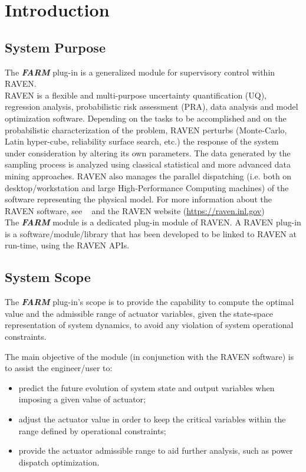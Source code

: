 \section{Introduction}
\subsection{System Purpose}

The \textbf{\textit{FARM}} plug-in is a generalized module for supervisory control within RAVEN.
\\RAVEN is a flexible and multi-purpose uncertainty quantification (UQ), regression analysis, probabilistic risk assessment 
(PRA), data analysis and model optimization software.  Depending on the tasks to be accomplished and on the 
probabilistic
 characterization of the problem, RAVEN perturbs (Monte-Carlo, Latin hyper-cube, reliability surface search, etc.) the
 response of the system under consideration by altering its own parameters. 
 The data generated by the sampling process is analyzed using classical statistical
 and more advanced data mining approaches. RAVEN also manages the parallel dispatching (i.e. both on
 desktop/workstation and large High-Performance Computing machines) of the software representing the physical 
 model.
 For more information about the RAVEN software, see ~\cite{RAVENuserManual} and the RAVEN website (\url{https://raven.inl.gov})
\\The  \textbf{\textit{FARM}} module is a dedicated plug-in module of RAVEN.
A RAVEN plug-in is a software/module/library that has been developed to be linked to RAVEN at run-time, using the RAVEN APIs.


\subsection{System Scope}

The \textbf{\textit{FARM}} plug-in’s scope is to provide the capability to compute the optimal value and the admissible range of 
actuator variables, given the state-space representation of system dynamics, to avoid any violation of system operational 
constraints.

 The main objective of the module (in conjunction with the RAVEN software) is to assist the engineer/user to:
\begin{itemize}
  \item predict the future evolution of system state and output variables when imposing a given value of actuator;
  \item adjust the actuator value in order to keep the critical variables within the range defined by operational constraints;
  \item provide the actuator admissible range to aid further analysis, such as power dispatch optimization.
\end{itemize}

